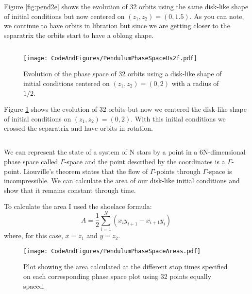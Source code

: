 Figure \ref{fig:pend2e} shows the evolution of 32 orbits using the same disk-like shape of initial conditions but now centered on $(z_1,z_2)=(0,1.5)$. As you can note, we continue to have orbits in libration but since we are getting closer to the separatrix the orbits start to have a oblong shape. 

\subsection{}

\begin{figure}
    \centering
    \texttt{[image: CodeAndFigures/PendulumPhaseSpaceUs2f.pdf]}
    \caption{Evolution of the phase space of 32 orbits using a disk-like shape of initial conditions centered on $(z_1,z_2)=(0,2)$ with a radius of $1/2$.}
    \label{fig:pend2f}
\end{figure}

Figure \ref{fig:pend2f} shows the evolution of 32 orbits but now we centered the disk-like shape of initial conditions on  $(z_1,z_2)=(0,2)$. With this initial conditions we crossed the separatrix and have orbits in rotation.  

\subsection{}
We can represent the state of a system of N stars by a point in a 6N-dimensional phase space called $\Gamma$-space and the point described by the coordinates is a $\Gamma$-point.  
Liouville’s theorem states that the flow of $\Gamma$-points through $\Gamma$-space is incompressible. We can calculate the area of our disk-like initial conditions and show that it remains constant through time.

To calculate the area I used the shoelace formula:
\begin{equation}
    A=\frac{1}{2}\sum_{i=1}^N\left(x_{i}y_{i+1}-x_{i+1}y_{i}\right)
\end{equation}
where, for this case, $x=z_1$ and $y=z_2$. 

\begin{figure}
    \centering
    \texttt{[image: CodeAndFigures/PendulumPhaseSpaceAreas.pdf]}
    \caption{Plot showing the area calculated at the different stop times specified on each corresponding phase space plot using 32 points equally spaced.}
    \label{fig:pendAreas}
\end{figure}

